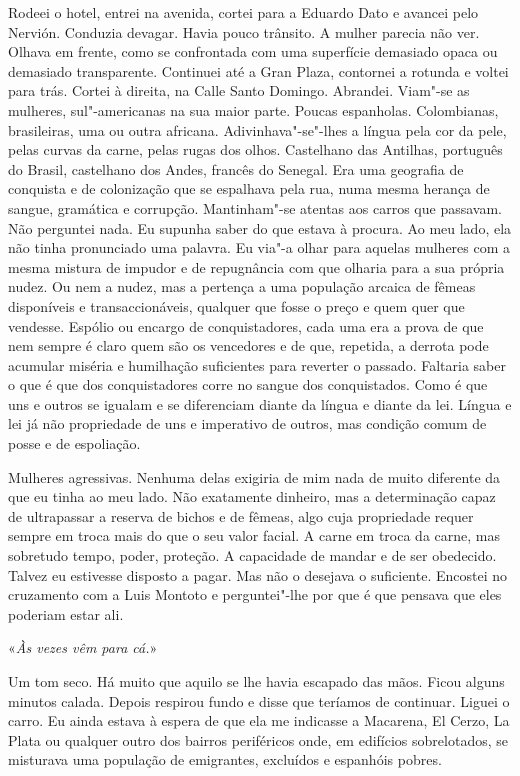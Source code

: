 Rodeei o hotel, entrei na avenida, cortei para a Eduardo Dato e avancei
pelo Nervión. Conduzia devagar. Havia pouco trânsito.
A mulher parecia não ver. Olhava em frente, como se confrontada com uma
superfície demasiado opaca ou demasiado transparente. Continuei até a
Gran Plaza, contornei a rotunda e voltei para trás. Cortei à direita, na
Calle Santo Domingo. Abrandei. Viam"-se as mulheres, sul"-americanas na
sua maior parte. Poucas espanholas. Colombianas, brasileiras, uma ou
outra africana. Adivinhava"-se"-lhes a língua pela cor da pele, pelas
curvas da carne, pelas rugas dos olhos. Castelhano das Antilhas,
português do Brasil, castelhano dos Andes, francês do Senegal. Era uma
geografia de conquista e de colonização que se espalhava pela rua, numa
mesma herança de sangue, gramática e corrupção. Mantinham"-se atentas
aos carros que passavam. Não perguntei nada. Eu supunha saber do que
estava à procura. Ao meu lado, ela não tinha pronunciado uma palavra. Eu
via"-a olhar para aquelas mulheres com a mesma mistura de impudor e de
repugnância com que olharia para a sua própria nudez. Ou nem a nudez,
mas a pertença a uma população arcaica de fêmeas disponíveis e
transaccionáveis, qualquer que fosse o preço e quem quer que vendesse.
Espólio ou encargo de conquistadores, cada uma era a prova de que nem
sempre é claro quem são os vencedores e de que, repetida, a derrota pode
acumular miséria e humilhação suficientes para reverter o passado.
Faltaria saber o que é que dos conquistadores corre no sangue dos
conquistados. Como é que uns e outros se igualam e se diferenciam diante
da língua e diante da lei. Língua e lei já não propriedade de uns e
imperativo de outros, mas condição comum de posse e de espoliação.

Mulheres agressivas. Nenhuma delas exigiria de mim nada de muito
diferente da que eu tinha ao meu lado. Não exatamente dinheiro, mas a
determinação capaz de ultrapassar a reserva de bichos e de fêmeas, algo
cuja propriedade requer sempre em troca mais do que o seu valor facial.
A carne em troca da carne, mas sobretudo tempo, poder, proteção. A
capacidade de mandar e de ser obedecido. Talvez eu estivesse disposto a
pagar. Mas não o desejava o suficiente. Encostei no cruzamento com a
Luis Montoto e perguntei"-lhe por que é que pensava que eles poderiam
estar ali.

«\emph{Às vezes vêm para cá.}»

Um tom seco. Há muito que aquilo se lhe havia escapado das mãos. Ficou
alguns minutos calada. Depois respirou fundo e disse que teríamos de
continuar. Liguei o carro. Eu ainda estava à espera de que ela me
indicasse a Macarena, El Cerzo, La Plata ou qualquer outro dos bairros
periféricos onde, em edifícios sobrelotados, se misturava uma população
de emigrantes, excluídos e espanhóis pobres.

